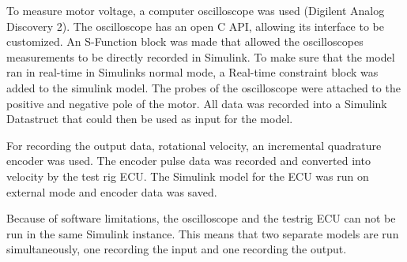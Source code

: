 To measure motor voltage, a computer oscilloscope was used (Digilent Analog
Discovery 2). The oscilloscope has an open C API, allowing its interface to be
customized. An S-Function block was made that allowed the oscilloscopes
measurements to be directly recorded in Simulink. To make sure that the model
ran in real-time in Simulinks normal mode, a Real-time constraint block was
added to the simulink model. The probes of the oscilloscope were attached to
the positive and negative pole of the motor. All data was recorded into a
Simulink Datastruct that could then be used as input for the model. 

For recording the output data, rotational velocity, an incremental quadrature
encoder was used. The encoder pulse data was recorded and converted into
velocity by the test rig ECU. The Simulink model for the ECU was run on external
mode and encoder data was saved. 

Because of software limitations, the oscilloscope and the testrig ECU can not be
run in the same Simulink instance. This means that two separate models are run
simultaneously, one recording the input and one recording the output.
